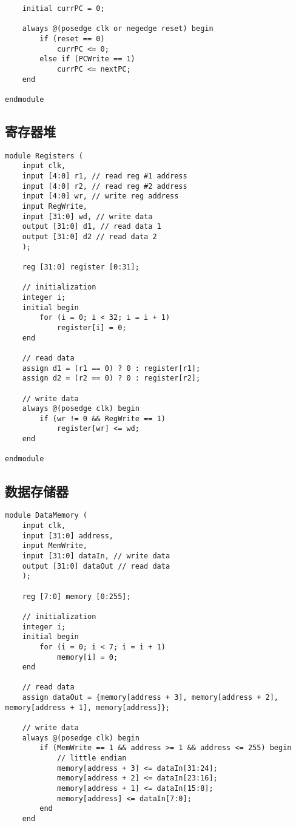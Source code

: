 \begin{multicols}{2}
\begin{lstlisting}
    initial currPC = 0;

    always @(posedge clk or negedge reset) begin
        if (reset == 0)
            currPC <= 0;
        else if (PCWrite == 1)
            currPC <= nextPC;
    end

endmodule
\end{lstlisting}

\subsection{寄存器堆}
\begin{lstlisting}
module Registers (
    input clk,
    input [4:0] r1, // read reg #1 address
    input [4:0] r2, // read reg #2 address
    input [4:0] wr, // write reg address
    input RegWrite,
    input [31:0] wd, // write data
    output [31:0] d1, // read data 1
    output [31:0] d2 // read data 2
    );
    
    reg [31:0] register [0:31];
    
    // initialization
    integer i;
    initial begin
        for (i = 0; i < 32; i = i + 1)
            register[i] = 0;
    end

    // read data
    assign d1 = (r1 == 0) ? 0 : register[r1];
    assign d2 = (r2 == 0) ? 0 : register[r2];

    // write data
    always @(posedge clk) begin
        if (wr != 0 && RegWrite == 1)
            register[wr] <= wd;
    end

endmodule
\end{lstlisting}

\subsection{数据存储器}
\begin{lstlisting}
module DataMemory (
    input clk,
    input [31:0] address,
    input MemWrite,
    input [31:0] dataIn, // write data
    output [31:0] dataOut // read data
    );
    
    reg [7:0] memory [0:255];

    // initialization
    integer i;
    initial begin
        for (i = 0; i < 7; i = i + 1)
            memory[i] = 0;
    end

    // read data
    assign dataOut = {memory[address + 3], memory[address + 2], memory[address + 1], memory[address]};

    // write data
    always @(posedge clk) begin
        if (MemWrite == 1 && address >= 1 && address <= 255) begin
            // little endian
            memory[address + 3] <= dataIn[31:24];
            memory[address + 2] <= dataIn[23:16];
            memory[address + 1] <= dataIn[15:8];
            memory[address] <= dataIn[7:0];
        end
    end


\end{lstlisting}
\end{multicols}
